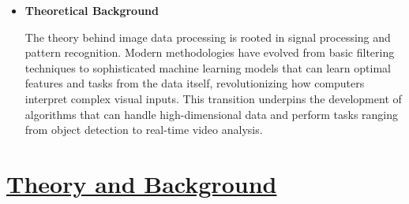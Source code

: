 \documentclass[11pt]{article}
\begin{document}
\begin{itemize}
\item\textbf{ Theoretical Background}\label{theoretical-background}

The theory behind image data processing is rooted in signal processing
and pattern recognition. Modern methodologies have evolved from basic
filtering techniques to sophisticated machine learning models that can
learn optimal features and tasks from the data itself, revolutionizing
how computers interpret complex visual inputs. This transition underpins
the development of algorithms that can handle high-dimensional data and
perform tasks ranging from object detection to real-time video analysis.
\end{itemize}

\section*{\Large\underline{\textbf{Theory and Background}}}\label{references}
\end{document}
